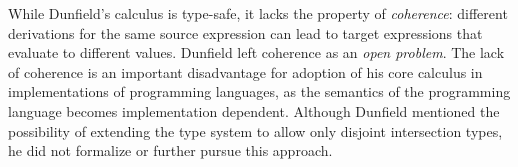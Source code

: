 

While Dunfield's calculus is type-safe, it lacks the property of
\emph{coherence}: different derivations for the same source expression can
lead to target expressions that evaluate to different values. 
Dunfield left coherence as
an \emph{open problem}. The lack of coherence is an important
disadvantage for adoption of his core calculus in implementations of
programming languages, as the semantics of the programming language
becomes implementation dependent. Although Dunfield mentioned the
possibility of extending the type system to allow only disjoint
intersection types, he did not formalize or further pursue this
approach. 


\begin{comment}
Moreover, from the theoretic point-of-view, the ambiguity that arises
from the lack of coherence makes the calculus unsatisfying when the
goal is to precisely capture the essence of solutions to
extensibility.
\end{comment}


